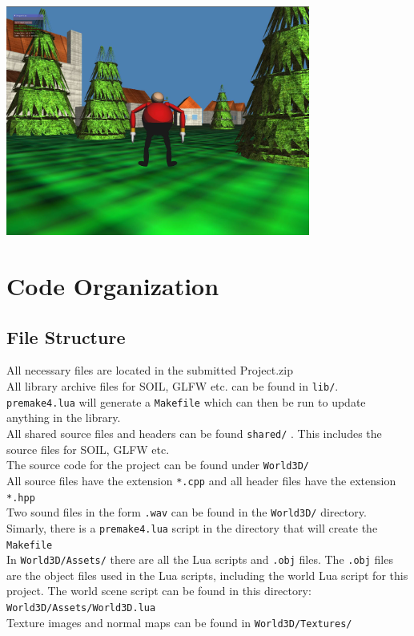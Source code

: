 \documentclass {article}
\begin{document}
\includegraphics[width=100mm]{screenshot.jpg}

\pagebreak

\section{Code Organization}
\subsection{File Structure}
All necessary files are located in the submitted Project.zip\\ \newline 
All library archive files for SOIL, GLFW etc. can be found in \texttt{lib/}.\\ \newline
\texttt{premake4.lua} will generate a \texttt{Makefile} which can then be run to update anything in the library.\\ \newline
All shared source files and headers can be found \texttt{shared/} . This includes the source files for SOIL, GLFW etc.\\ \newline
The source code for the project can be found under \texttt{World3D/}\\ 
All source files have the extension \texttt{*.cpp} and all header files have the extension \texttt{*.hpp}\\
Two sound files in the form \texttt{.wav} can be found in the \texttt{World3D/} directory.\\ \newline
Simarly, there is a \texttt{premake4.lua} script in the directory that will create the \texttt{Makefile}\\ \newline
In \texttt{World3D/Assets/} there are all the Lua scripts and \texttt{.obj} files. The \texttt{.obj} files are the object files used in the Lua scripts, including the world Lua script for this project. The world scene script can be found in this directory: \texttt{World3D/Assets/World3D.lua} \\ \newline
Texture images and normal maps can be found in \texttt{World3D/Textures/}
\end{document}
